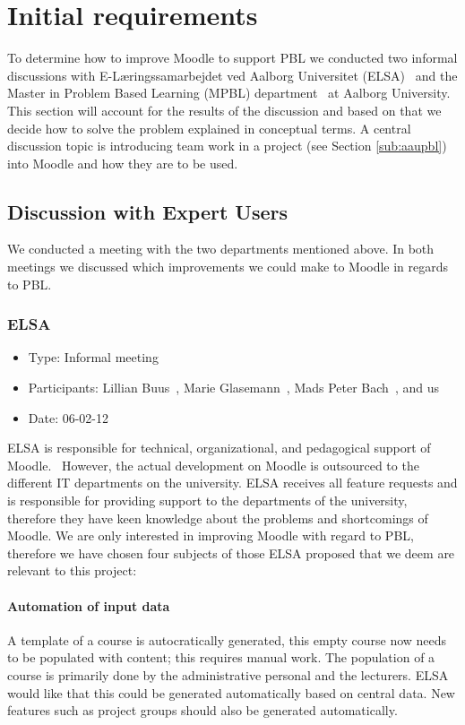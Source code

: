 \chapter{Initial requirements}
\label{sec:initialAnalysis}
To determine how to improve Moodle to support PBL we conducted two informal discussions with E-L\ae{}ringssamarbejdet ved Aalborg Universitet (ELSA)~\cite{elsa} and the Master in Problem Based Learning (MPBL) department~\cite{mpbl} at Aalborg University.
This section will account for the results of the discussion and based on that we decide how to solve the problem explained in conceptual terms.
A central discussion topic is introducing team work in a project (see Section \ref{sub:aaupbl}) into Moodle and how they are to be used.

\section{Discussion with Expert Users}  
\label{sub:expertUsers} 
We conducted a meeting with the two departments mentioned above. 
In both meetings we discussed which improvements we could make to Moodle in regards to PBL.  

\subsection{ELSA}
\label{sub:elsaInterview}
\begin{itemize}
	\item Type: Informal meeting
	\item Participants: Lillian Buus~\cite{lillian}, Marie Glasemann~\cite{marie}, Mads Peter Bach~\cite{mads}, and us 
	\item Date: 06-02-12
\end{itemize}
ELSA is responsible for technical, organizational, and pedagogical support of Moodle.~\cite{elsa} 
However, the actual development on Moodle is outsourced to the different IT departments on the university. 
ELSA receives all feature requests and is responsible for providing support to the departments of the university, therefore they have keen knowledge about the problems and shortcomings of Moodle. 
We are only interested in improving Moodle with regard to PBL, therefore we have chosen four subjects of those ELSA proposed that we deem are relevant to this project:

\subsubsection{Automation of input data} A template of a course is autocratically generated, this empty course now needs to be populated with content; this requires manual work. 
The population of a course is primarily done by the administrative personal and the lecturers. 
ELSA would like that this could be generated automatically based on central data. 
New features such as project groups should also be generated automatically.

